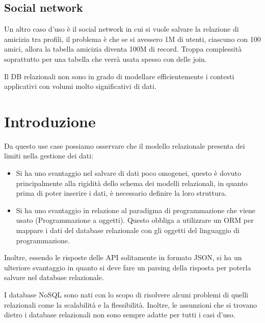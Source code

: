 \subsection*{Social network}
Un altro caso d'uso è il social network in cui si vuole salvare la relazione di
amicizia tra profili, il problema è che se si avessero 1M di utenti, ciascuno con
100 amici, allora la tabella amicizia diventa 100M di record. Troppa complessità
soprattutto per una tabella che verrà usata spesso con delle join.

Il DB relazionali non sono in grado di modellare efficientemente i contesti applicativi
con volumi molto significativi di dati.
\section{Introduzione}
Da questo use case possiamo osservare che il modello relazionale presenta dei
limiti nella gestione dei dati:
\begin{itemize}
      \item Si ha uno svantaggio nel salvare di dati poco omogenei, questo è dovuto
            principalmente alla rigidità dello schema dei modelli relazionali, in
            quanto prima di poter inserire i dati, è necessario definire la loro
            struttura.
      \item Si ha uno svantaggio in relazione al paradigma di programmazione che
            viene usato (Programmazione a oggetti). Questo obbliga a utilizzare
            un ORM per mappare i dati del database relazionale con gli oggetti
            del linguaggio di programmazione.
\end{itemize}
Inoltre, essendo le risposte delle API solitamente in formato JSON, si ha un
ulteriore svantaggio in quanto si deve fare un parsing della risposta per
poterla salvare nel database relazionale.

I database NoSQL sono nati con lo scopo di risolvere alcuni problemi di quelli
relazionali come la scalabilità e la flessibilità. Inoltre, le assunzioni che
si trovano dietro i database relazionali non sono sempre adatte per tutti i
casi d'uso.

